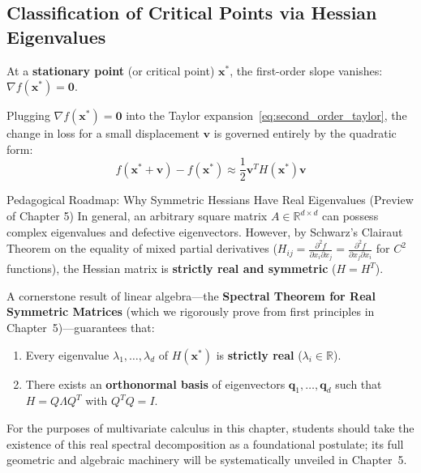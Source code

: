 \subsection{Classification of Critical Points via Hessian Eigenvalues}
At a \textbf{stationary point} (or critical point) $\mathbf{x}^*$, the first-order slope vanishes: $\nabla f(\mathbf{x}^*) = \mathbf{0}$. 

Plugging $\nabla f(\mathbf{x}^*) = \mathbf{0}$ into the Taylor expansion~\eqref{eq:second_order_taylor}, the change in loss for a small displacement $\mathbf{v}$ is governed entirely by the quadratic form:
\begin{equation}
f(\mathbf{x}^* + \mathbf{v}) - f(\mathbf{x}^*) \approx \frac{1}{2} \mathbf{v}^T H(\mathbf{x}^*) \mathbf{v}
\end{equation}

\begin{theorembox}{Pedagogical Roadmap: Why Symmetric Hessians Have Real Eigenvalues (Preview of Chapter 5)}
In general, an arbitrary square matrix $A \in \mathbb{R}^{d \times d}$ can possess complex eigenvalues and defective eigenvectors. However, by Schwarz's Clairaut Theorem on the equality of mixed partial derivatives ($H_{ij} = \frac{\partial^2 f}{\partial x_i \partial x_j} = \frac{\partial^2 f}{\partial x_j \partial x_i}$ for $C^2$ functions), the Hessian matrix is \textbf{strictly real and symmetric} ($H = H^T$).

A cornerstone result of linear algebra---the \textbf{Spectral Theorem for Real Symmetric Matrices} (which we rigorously prove from first principles in Chapter~5)---guarantees that:
\begin{enumerate}[leftmargin=*, noitemsep]
    \item Every eigenvalue $\lambda_1, \dots, \lambda_d$ of $H(\mathbf{x}^*)$ is \textbf{strictly real} ($\lambda_i \in \mathbb{R}$).
    \item There exists an \textbf{orthonormal basis} of eigenvectors $\mathbf{q}_1, \dots, \mathbf{q}_d$ such that $H = Q \Lambda Q^T$ with $Q^T Q = I$.
\end{enumerate}
For the purposes of multivariate calculus in this chapter, students should take the existence of this real spectral decomposition as a foundational postulate; its full geometric and algebraic machinery will be systematically unveiled in Chapter~5.
\end{theorembox}

